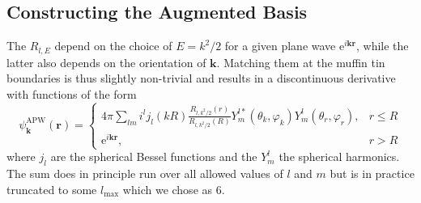 \documentclass[a4paper,DIV=12,english]{scrartcl}
\begin{document}
\subsection{Constructing the Augmented Basis}
The $R_{l,E}$ depend on the choice of $E=k^2/2$ for a given plane wave $\text{e}^{i\textbf{k}\textbf{r}}$, while the latter also depends on the orientation of $\textbf{k}$. Matching them at the muffin tin boundaries is thus slightly non-trivial and results in a discontinuous derivative with functions of the form~\cite{Thijssen2007cp} 
\begin{equation}
    \psi^{\text{APW}}_\textbf{k} (\textbf{r}) = 
    \begin{cases}
        4\pi \sum_{lm}i^l j_l(kR)\frac{R_{l,k^2/2}(r)}{R_{l,k^2/2}(R)} Y^{l*}_m (\theta_k, \varphi_k) Y^{l}_m (\theta_r, \varphi_r), & r \leq R \\
        \text{e}^{i\textbf{k}\textbf{r}}, & r > R
    \end{cases} 
\end{equation}
where $j_l$ are the spherical Bessel functions and the $Y^l_m$ the spherical harmonics. The sum does in principle run over all allowed values of $l$ and $m$ but is in practice truncated to some $l_\text{max}$ which we chose as 6.
\end{document}
